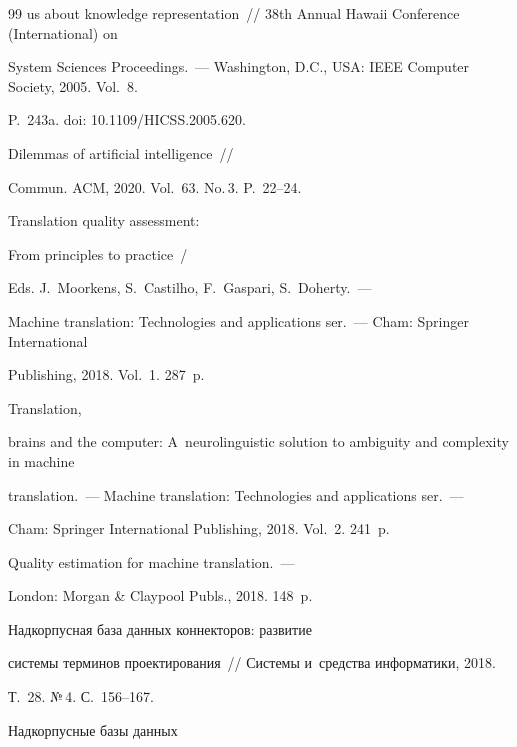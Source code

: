 {{\begin{thebibliography}{99}
us about knowledge representation~/\!\!/ 38th Annual Hawaii Conference (International) on 


System Sciences Proceedings.~---  Washington, D.C., USA: IEEE Computer Society, 2005. Vol.~8. 


P.~243a. doi: 10.1109\!/\!HICSS.2005.620.




 Dilemmas of artificial intelligence~/\!\!/ 


Commun. ACM, 2020. Vol.~63. No.\,3. P.~22--24.




Translation quality assessment:


From principles to practice~/ 


Eds. J.~Moorkens, S.~Castilho, F.~Gaspari, S.~Doherty.~--- 


Machine translation: Technologies and applications ser.~--- Cham: Springer International 


Publishing, 2018. Vol.~1. 287~p.




 Translation, 


brains and the computer: A~neurolinguistic solution to ambiguity and complexity in machine 


translation.~--- Machine translation: Technologies and applications ser.~---


Cham: Springer International Publishing, 2018.  Vol.~2. 241~p.




 Quality estimation for machine translation.~--- 


London: Morgan \& Claypool Publs., 2018. 148~p.







 Надкорпусная база данных коннекторов: развитие 


системы терминов проектирования~/\!\!/ Системы и~средства информатики, 2018. 


Т.~28. №\,4. С.~156--167.







 Надкорпусные базы данных 



\end{thebibliography}}}
